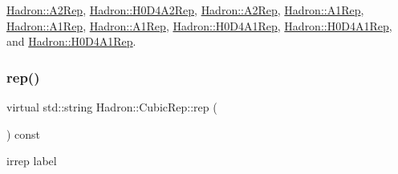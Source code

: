 \mbox{\hyperlink{structHadron_1_1A2Rep_a31e1135ddb204394f1c6153797a7dffa}{Hadron\+::\+A2\+Rep}}, \mbox{\hyperlink{structHadron_1_1H0D4A2Rep_ad23c66fe369200d0ff8bebcabf8dfc62}{Hadron\+::\+H0\+D4\+A2\+Rep}}, \mbox{\hyperlink{structHadron_1_1A2Rep_a31e1135ddb204394f1c6153797a7dffa}{Hadron\+::\+A2\+Rep}}, \mbox{\hyperlink{structHadron_1_1A1Rep_a6b592d902063cfea9bd1cedcdeb9ac79}{Hadron\+::\+A1\+Rep}}, \mbox{\hyperlink{structHadron_1_1A1Rep_a6b592d902063cfea9bd1cedcdeb9ac79}{Hadron\+::\+A1\+Rep}}, \mbox{\hyperlink{structHadron_1_1A1Rep_a6b592d902063cfea9bd1cedcdeb9ac79}{Hadron\+::\+A1\+Rep}}, \mbox{\hyperlink{structHadron_1_1H0D4A1Rep_afbedc9857e7215106a2225ff351ada68}{Hadron\+::\+H0\+D4\+A1\+Rep}}, \mbox{\hyperlink{structHadron_1_1H0D4A1Rep_afbedc9857e7215106a2225ff351ada68}{Hadron\+::\+H0\+D4\+A1\+Rep}}, and \mbox{\hyperlink{structHadron_1_1H0D4A1Rep_afbedc9857e7215106a2225ff351ada68}{Hadron\+::\+H0\+D4\+A1\+Rep}}.

\mbox{\label{structHadron_1_1CubicRep_ac3eb63608803d44c68681f158e14eb1b}} 
\subsubsection{\texorpdfstring{rep()}{rep()}\hspace{0.1cm}{\footnotesize\ttfamily [2/3]}}
{\footnotesize\ttfamily virtual std\+::string Hadron\+::\+Cubic\+Rep\+::rep (\begin{DoxyParamCaption}{ }\end{DoxyParamCaption}) const\hspace{0.3cm}{\ttfamily [pure virtual]}}

irrep label 

